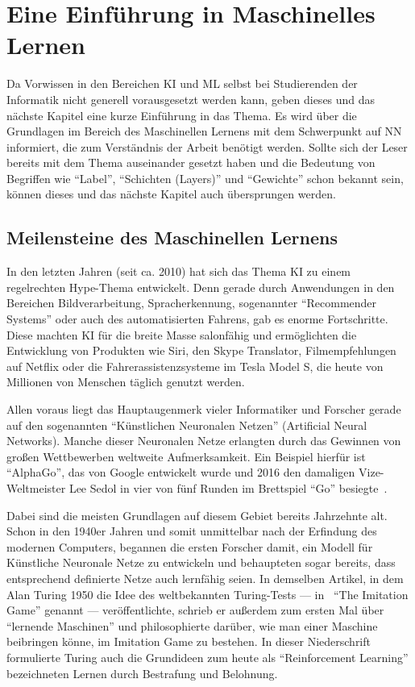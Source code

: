 \chapter{Eine Einführung in Maschinelles Lernen}
Da Vorwissen in den Bereichen \gls{KI} und \gls{ML} selbst bei Studierenden der Informatik nicht generell vorausgesetzt werden kann, geben dieses und das nächste Kapitel eine kurze Einführung in das Thema. Es wird über die Grundlagen im Bereich des Maschinellen Lernens mit dem Schwerpunkt auf \gls{NN} informiert, die zum Verständnis der Arbeit benötigt werden. Sollte sich der Leser bereits mit dem Thema auseinander gesetzt haben und die Bedeutung von Begriffen wie "`\gls{Label}"', "`Schichten (Layers)"' und "`Gewichte"' schon bekannt sein, können dieses und das nächste Kapitel auch übersprungen werden.

\section{Meilensteine des Maschinellen Lernens} \label{sec:milestones}
In den letzten Jahren (seit ca. 2010) hat sich das Thema \gls{KI} zu einem regelrechten Hype-Thema entwickelt. Denn gerade durch Anwendungen in den Bereichen Bildverarbeitung, Spracherkennung, sogenannter "`Recommender Systems"' oder auch des automatisierten Fahrens, gab es enorme Fortschritte. Diese machten \gls{KI} für die breite Masse salonfähig und ermöglichten die Entwicklung von Produkten wie Siri, den Skype Translator, Filmempfehlungen auf Netflix oder die Fahrerassistenzsysteme im Tesla Model S, die heute von Millionen von Menschen täglich genutzt werden.

Allen voraus liegt das Hauptaugenmerk vieler Informatiker und Forscher gerade auf den sogenannten "`Künstlichen Neuronalen Netzen"' (Artificial Neural Networks). Manche dieser Neuronalen Netze erlangten durch das Gewinnen von großen Wettbewerben weltweite Aufmerksamkeit. Ein Beispiel hierfür ist "`AlphaGo"', das von Google entwickelt wurde und 2016 den damaligen Vize-Weltmeister Lee Sedol in vier von fünf Runden im Brettspiel "`Go"' besiegte~\cite{alphaGo}.

Dabei sind die meisten Grundlagen auf diesem Gebiet bereits Jahrzehnte alt. Schon in den 1940er Jahren und somit unmittelbar nach der Erfindung des modernen Computers, begannen die ersten Forscher damit, ein Modell für Künstliche Neuronale Netze zu entwickeln und behaupteten sogar bereits, dass entsprechend definierte Netze auch lernfähig seien. In demselben Artikel, in dem Alan Turing 1950 die Idee des weltbekannten Turing-Tests --- in~\cite{TURING.1950} "`The Imitation Game"' genannt --- veröffentlichte, schrieb er außerdem zum ersten Mal über "`lernende Maschinen"' und philosophierte darüber, wie man einer Maschine beibringen könne, im Imitation Game zu bestehen. In dieser Niederschrift formulierte Turing auch die Grundideen zum heute als "`Reinforcement Learning"' bezeichneten Lernen durch Bestrafung und Belohnung.

